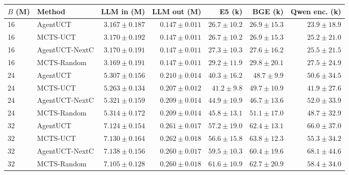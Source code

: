 \begin{tabular}{@{}llrrrrr@{}}
\toprule
$B$ (M) & Method & LLM in (M) & LLM out (M) & E5 (k) & BGE (k) & Qwen enc. (k) \\
\midrule
16 & AgentUCT & $3.167 \pm 0.187$ & $0.147 \pm 0.011$ & $26.7 \pm 10.2$ & $26.9 \pm 15.3$ & $23.9 \pm 18.9$ \\
16 & MCTS-UCT & $3.170 \pm 0.192$ & $0.147 \pm 0.011$ & $26.7 \pm 10.2$ & $26.9 \pm 15.3$ & $25.2 \pm 21.0$ \\
16 & AgentUCT-NextC & $3.170 \pm 0.191$ & $0.147 \pm 0.011$ & $27.3 \pm 10.3$ & $27.6 \pm 16.2$ & $25.5 \pm 21.5$ \\
16 & MCTS-Random & $3.169 \pm 0.191$ & $0.147 \pm 0.011$ & $29.2 \pm 11.9$ & $29.8 \pm 20.1$ & $27.5 \pm 24.9$ \\
24 & AgentUCT & $5.307 \pm 0.156$ & $0.210 \pm 0.014$ & $40.3 \pm 16.2$ & $48.7 \pm 9.9$ & $50.6 \pm 34.5$ \\
24 & MCTS-UCT & $5.263 \pm 0.134$ & $0.207 \pm 0.012$ & $41.2 \pm 9.8$ & $49.7 \pm 10.9$ & $41.9 \pm 27.6$ \\
24 & AgentUCT-NextC & $5.321 \pm 0.159$ & $0.209 \pm 0.014$ & $44.9 \pm 10.9$ & $46.7 \pm 13.6$ & $52.0 \pm 33.9$ \\
24 & MCTS-Random & $5.314 \pm 0.172$ & $0.209 \pm 0.014$ & $45.8 \pm 13.1$ & $51.1 \pm 17.0$ & $48.7 \pm 32.9$ \\
32 & AgentUCT & $7.124 \pm 0.154$ & $0.261 \pm 0.017$ & $57.2 \pm 19.0$ & $62.4 \pm 13.1$ & $66.0 \pm 37.0$ \\
32 & MCTS-UCT & $7.130 \pm 0.164$ & $0.262 \pm 0.018$ & $56.6 \pm 15.8$ & $63.8 \pm 12.3$ & $55.3 \pm 34.2$ \\
32 & AgentUCT-NextC & $7.138 \pm 0.156$ & $0.260 \pm 0.017$ & $59.5 \pm 10.3$ & $60.4 \pm 19.6$ & $68.1 \pm 44.6$ \\
32 & MCTS-Random & $7.105 \pm 0.128$ & $0.260 \pm 0.018$ & $61.6 \pm 10.9$ & $62.7 \pm 20.9$ & $58.4 \pm 34.0$ \\
\bottomrule
\end{tabular}
